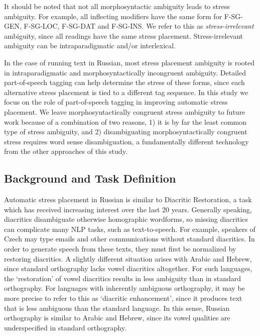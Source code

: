 \documentclass[11pt]{article}
\begin{document}
It should be noted that not all morphosyntactic ambiguity leads to stress 
ambiguity. For example, all inflecting modifiers have the same form for F-SG-GEN, 
F-SG-LOC, F-SG-DAT and F-SG-INS. We refer to this as \emph{stress-irrelevant} 
ambiguity, since all readings have
the same stress placement. Stress-irrelevant ambiguity can be intraparadigmatic 
and/or interlexical. 

In the case of running text in Russian, most stress placement 
ambiguity is rooted in intraparadigmatic and morphosyntactically incongruent 
ambiguity. Detailed part-of-speech tagging can help determine the stress of 
these forms, since each alternative stress placement is tied to a different
tag sequence. In this study we focus on 
the role of part-of-speech tagging in improving
automatic stress placement. We leave morphosyntactically congruent stress 
ambiguity to future work because of a combination of two reasons, 1) it is by far the least common type of stress ambiguity, and 2) disambiguating morphosyntactically congruent stress requires word sense disambiguation, a fundamentally different technology from the other approaches of this study.

\subsection{Background and Task Definition} \label{background}

Automatic stress placement in Russian is similar to Diacritic Restoration, a task
which has received increasing interest over the last 20 years. Generally 
speaking, diacritics disambiguate otherwise homographic wordforms, so missing 
diacritics can complicate many NLP tasks, such as text-to-speech. For example, 
speakers of Czech may type emails and other communications
without standard diacritics. In order to generate speech from these texts, they 
must first be normalized by restoring diacritics. A slightly different
situation arises with Arabic and Hebrew, since standard orthography lacks vowel 
diacritics altogether. For such languages, the `restoration' of vowel diacritics 
results in less ambiguity than in standard orthography. For languages with 
inherently ambiguous orthography,
it may be more precise to refer to this as `diacritic enhancement', since it 
produces text that is less ambiguous than the standard language. In this sense, 
Russian orthography is similar to Arabic and Hebrew, since its vowel qualities 
are underspecified in standard orthography.
\end{document}
